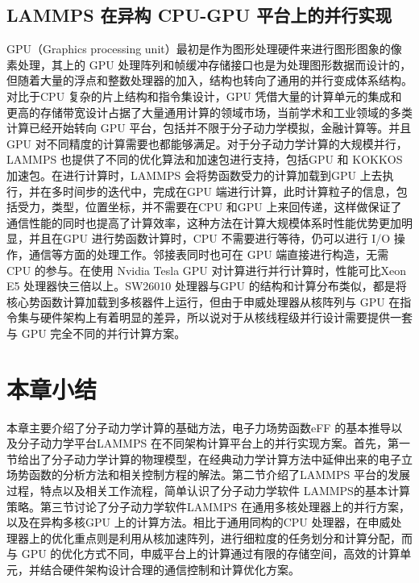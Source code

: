 \subsection{LAMMPS 在异构 CPU-GPU 平台上的并行实现}
GPU（Graphics processing unit）最初是作为图形处理硬件来进行图形图象的像素处理，其上的 GPU 处理阵列和帧缓冲存储接口也是为处理图形数据而设计的，但随着大量的浮点和整数处理器的加入，结构也转向了通用的并行变成体系结构。对比于CPU 复杂的片上结构和指令集设计，GPU 凭借大量的计算单元的集成和更高的存储带宽设计占据了大量通用计算的领域市场，当前学术和工业领域的多类计算已经开始转向 GPU 平台，包括并不限于分子动力学模拟，金融计算等。并且 GPU 对不同精度的计算需要也都能够满足。对于分子动力学计算的大规模并行，LAMMPS 也提供了不同的优化算法和加速包进行支持，包括GPU 和 KOKKOS 加速包。在进行计算时，LAMMPS 会将势函数受力的计算加载到GPU 上去执行，并在多时间步的迭代中，完成在GPU 端进行计算，此时计算粒子的信息，包括受力，类型，位置坐标，并不需要在CPU 和GPU 上来回传递，这样做保证了通信性能的同时也提高了计算效率，这种方法在计算大规模体系时性能优势更加明显，并且在GPU 进行势函数计算时，CPU 不需要进行等待，仍可以进行 I/O 操作，通信等方面的处理工作。邻接表同时也可在 GPU 端直接进行构造，无需 CPU 的参与。在使用 Nvidia Tesla GPU 对计算进行并行计算时，性能可比Xeon E5 处理器快三倍以上。SW26010 处理器与GPU 的结构和计算分布类似，都是将核心势函数计算加载到多核器件上运行，但由于申威处理器从核阵列与 GPU 在指令集与硬件架构上有着明显的差异，所以说对于从核线程级并行设计需要提供一套与 GPU 完全不同的并行计算方案。

\section{本章小结}
本章主要介绍了分子动力学计算的基础方法，电子力场势函数eFF 的基本推导以及分子动力学平台LAMMPS 在不同架构计算平台上的并行实现方案。首先，第一节给出了分子动力学计算的物理模型，在经典动力学计算方法中延伸出来的电子立场势函数的分析方法和相关控制方程的解法。第二节介绍了LAMMPS 平台的发展过程，特点以及相关工作流程，简单认识了分子动力学软件 LAMMPS的基本计算策略。第三节讨论了分子动力学软件LAMMPS 在通用多核处理器上的并行方案，以及在异构多核GPU 上的计算方法。相比于通用同构的CPU 处理器，在申威处理器上的优化重点则是利用从核加速阵列，进行细粒度的任务划分和计算分配，而与 GPU 的优化方式不同，申威平台上的计算通过有限的存储空间，高效的计算单元，并结合硬件架构设计合理的通信控制和计算优化方案。
